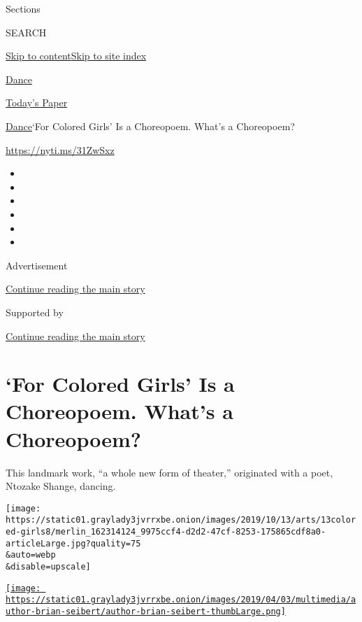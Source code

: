 Sections

SEARCH

\protect\hyperlink{site-content}{Skip to
content}\protect\hyperlink{site-index}{Skip to site index}

\href{https://www.nytimes3xbfgragh.onion/section/arts/dance}{Dance}

\href{https://myaccount.nytimes3xbfgragh.onion/auth/login?response_type=cookie\&client_id=vi}{}

\href{https://www.nytimes3xbfgragh.onion/section/todayspaper}{Today's
Paper}

\href{/section/arts/dance}{Dance}\textbar{}`For Colored Girls' Is a
Choreopoem. What's a Choreopoem?

\url{https://nyti.ms/31ZwSxz}

\begin{itemize}
\item
\item
\item
\item
\item
\item
\end{itemize}

Advertisement

\protect\hyperlink{after-top}{Continue reading the main story}

Supported by

\protect\hyperlink{after-sponsor}{Continue reading the main story}

\hypertarget{for-colored-girls-is-a-choreopoem-whats-a-choreopoem}{%
\section{`For Colored Girls' Is a Choreopoem. What's a
Choreopoem?}\label{for-colored-girls-is-a-choreopoem-whats-a-choreopoem}}

This landmark work, ``a whole new form of theater,'' originated with a
poet, Ntozake Shange, dancing.

\texttt{[image: https://static01.graylady3jvrrxbe.onion/images/2019/10/13/arts/13colored-girls8/merlin\_162314124\_9975ccf4-d2d2-47cf-8253-175865cdf8a0-articleLarge.jpg?quality=75\\\&auto=webp\\\&disable=upscale]}

\href{https://www.nytimes3xbfgragh.onion/by/brian-seibert}{\texttt{[image: https://static01.graylady3jvrrxbe.onion/images/2019/04/03/multimedia/author-brian-seibert/author-brian-seibert-thumbLarge.png]}}

